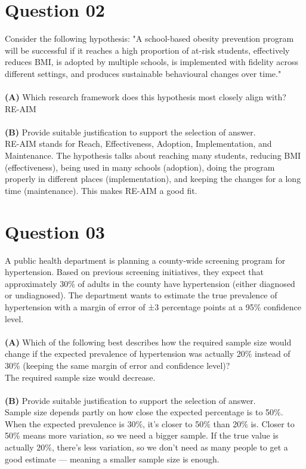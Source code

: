 \documentclass{article}
\begin{document}
\section*{Question 02}
Consider the following hypothesis: "A school-based obesity prevention program
will
be successful if it reaches a high proportion of at-risk students, effectively
reduces
BMI, is adopted by multiple schools, is implemented with fidelity across
different
settings, and produces sustainable behavioural changes over time."
\\\\
\noindent \textbf{(A)} Which research framework does this hypothesis most
closely align with? \\[0.2cm]
\noindent RE-AIM
\\\\
\noindent \textbf{(B)} Provide suitable justification to support the selection
of answer. \\[0.2cm]
\noindent
RE-AIM stands for Reach, Effectiveness, Adoption, Implementation, and
Maintenance. The hypothesis talks about reaching many students, reducing BMI
(effectiveness), being used in many schools (adoption), doing the program
properly in different places (implementation), and keeping the changes for a
long time (maintenance). This makes RE-AIM a good fit.

\section*{Question 03}
A public health department is planning a county-wide screening program for
hypertension. Based on previous screening initiatives, they expect that
approximately 30\% of adults in the county have hypertension (either diagnosed
or undiagnosed). The department wants to estimate the true prevalence of
hypertension with a margin of error of ±3 percentage points at a 95\%
confidence
level.
\\\\
\noindent \textbf{(A)} Which of the following best describes how the required
sample size would
change if the expected prevalence of hypertension was actually 20\% instead of
30\% (keeping the same margin of error and confidence level)?\\[0.2cm]
\noindent The required sample size would decrease.
\\\\
\noindent \textbf{(B)} Provide suitable justification to support the selection
of answer. \\[0.2cm]
\noindent
Sample size depends partly on how close the expected percentage is to 50\%.
When the expected prevalence is 30\%, it's closer to 50\% than 20\% is. Closer
to 50\% means more variation, so we need a bigger sample. If the true value is
actually 20\%, there’s less variation, so we don’t need as many people to get a
good estimate — meaning a smaller sample size is enough.
\end{document}
